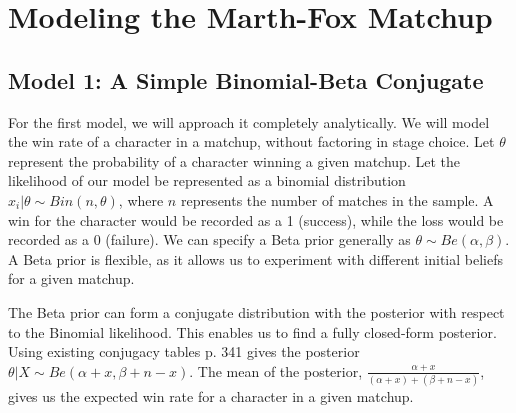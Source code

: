 \chapter{Modeling the Marth-Fox Matchup}
\newpage

\section{Model 1: A Simple Binomial-Beta Conjugate}
For the first model, we will approach it completely analytically. We will model the win rate of a character in a matchup, without factoring in stage choice. Let $\theta$ represent the probability of a character winning a given matchup. Let the likelihood of our model be represented as a binomial distribution $x_i|\theta\sim Bin(n,\theta)$, where $n$ represents the number of matches in the sample. A win for the character would be recorded as a 1 (success), while the loss would be recorded as a 0 (failure). We can specify a Beta prior generally as $\theta\sim Be(\alpha,\beta)$. A Beta prior is flexible, as it allows us to experiment with different initial beliefs for a given matchup.

\indent The Beta prior can form a conjugate distribution with the posterior with respect to the Binomial likelihood. This enables us to find a fully closed-form posterior. Using existing conjugacy tables \citep{brani_vidakovic_2017} p. 341 gives the posterior $\theta|X\sim Be(\alpha+x, \beta+n-x)$. The mean of the posterior, $\frac{\alpha+x}{(\alpha+x)+(\beta+n-x)}$, gives us the expected win rate for a character in a given matchup.

